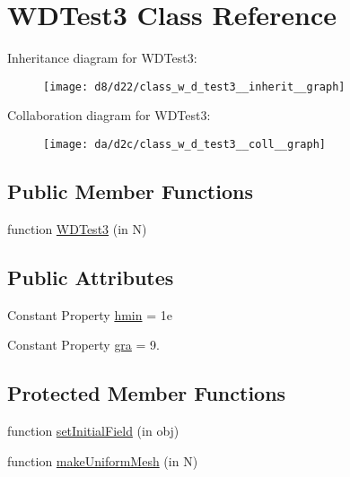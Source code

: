 \hypertarget{class_w_d_test3}{}\section{W\+D\+Test3 Class Reference}
\label{class_w_d_test3}


Inheritance diagram for W\+D\+Test3\+:
\nopagebreak
\begin{figure}[H]
\begin{center}
\leavevmode
\texttt{[image: d8/d22/class\_w\_d\_test3\_\_inherit\_\_graph]}
\end{center}
\end{figure}


Collaboration diagram for W\+D\+Test3\+:
\nopagebreak
\begin{figure}[H]
\begin{center}
\leavevmode
\texttt{[image: da/d2c/class\_w\_d\_test3\_\_coll\_\_graph]}
\end{center}
\end{figure}
\subsection*{Public Member Functions}
\begin{DoxyCompactItemize}
\item 
function \hyperlink{class_w_d_test3_a41990bc1f69ba2505eb8b66398cf0ad1}{W\+D\+Test3} (in N)
\end{DoxyCompactItemize}
\subsection*{Public Attributes}
\begin{DoxyCompactItemize}
\item 
Constant Property \hyperlink{class_w_d_test3_a38ccbba7402f3c17bd3785b293189a95}{hmin} = 1e
\item 
Constant Property \hyperlink{class_w_d_test3_a1feb9bef13924055a0570c5307dd0f10}{gra} = 9.
\end{DoxyCompactItemize}
\subsection*{Protected Member Functions}
\begin{DoxyCompactItemize}
\item 
function \hyperlink{class_w_d_test3_a2028a2f6e03c61dc1333d1caebf099c1}{set\+Initial\+Field} (in obj)
\item 
function \hyperlink{class_w_d_test3_a439af3974787bf348e000f70586ed131}{make\+Uniform\+Mesh} (in N)
\end{DoxyCompactItemize}


